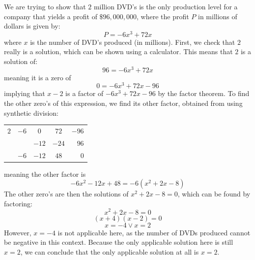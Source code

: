 \documentclass{article}
\theoremstyle{definition}
\begin{document}
We are trying to show that $2$ million DVD's is the only production level for a company that yields a profit of $\$96,000,000$, where the 
profit $P$ in millions of dollars is given by:
\[ P=-6x^3+72x\] where $x$ is the number of DVD's produced (in millions). First, we check that $2$ really is a solution, which can be shown using a 
calculator. This means that $2$ is a solution of:
\[ 96=-6x^3+72x \] meaning it is a zero of 
\[ 0=-6x^3+72x-96 \] implying that $x-2$ is a factor of $-6x^3+72x-96$ by the factor theorem. 
To find the other zero's of this expression, we find its other factor, 
obtained from using synthetic division:
\FloatBarrier
	\begin{center}
		\begin{tabular}{l|cccr}
			$2$ & $-6$ & $0$ & $72$ & $-96$ \\
			& & $-12$ & $-24$ & $96$ \\[-4.75pt]
			\cmidrule{2-5}
			& $-6$ & $-12$ & $48$ & $0$
		\end{tabular}
	\end{center}
\FloatBarrier
meaning the other factor is \[ -6x^2-12x+48=-6(x^2+2x-8) \] 
The other zero's are then the solutions of $x^2+2x-8=0$, which can be found by factoring:
\[ x^2+2x-8=0 \]
\[ (x+4)(x-2)=0 \]
\[ x=-4\vee x=2 \]
However, $x=-4$ is not applicable here, as the number of DVDs produced cannot be negative in this context. Because the only applicable solution here is 
still $x=2$, we can conclude that the only applicable solution at all is $x=2$.
\end{document}
